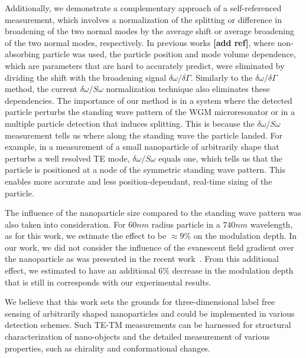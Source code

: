 \documentclass[journal=jacsat,manuscript=article]{achemso}
\begin{document}
Additionally, we demonstrate a complementary approach of a self-referenced measurement, which involves a normalization of the splitting or difference in broadening of the two normal modes by the average shift or average broadening of the two normal modes, respectively. In previous works \textbf{[add ref]}, where non-absorbing particle was used, the particle position and mode volume dependence, which are parameters that are hard to accurately predict, were eliminated by dividing the shift with the broadening signal $\delta \omega / \delta \Gamma$. Similarly to the $\delta \omega / \delta \Gamma$ method, the current $\delta \omega / \textit{S} \omega$ normalization technique also eliminates these dependencies. The importance of our method is in a system where the detected particle perturbs the standing wave pattern of the WGM microresonator or in a multiple particle detection that induces splitting. This is because the $\delta \omega / \textit{S} \omega$ measurement tells us where along the standing wave the particle landed. For example, in a measurement of a small nanoparticle of arbitrarily shape that perturbs a well resolved TE mode, $\delta \omega / \textit{S} \omega$ equals one, which tells us that the particle is positioned at a node of the symmetric standing wave pattern. This enables more accurate and less position-dependant, real-time sizing of the particle.

The influence of the nanoparticle size compared to the standing wave pattern was also taken into consideration. For $60nm$ radius particle in a $740 nm$ wavelength, as for this work, we estimate the effect to be $\approx 9\% $ on the modulation depth.
In our work, we did not consider the influence of the evanescent field gradient over the nanoparticle as was presented in the recent work~\cite{foreman2017Whispering}. From this additional effect, we estimated to have an additional $6 \% $ decrease in the modulation depth that is still in corresponds with our experimental results.

We believe that this work sets the grounds for three-dimensional label free sensing of arbitrarily shaped nanoparticles and could be implemented in various detection schemes. Such TE-TM measurements can be harnessed for structural characterization of nano-objects and the detailed measurement of various properties, such as chirality and conformational changes.

\begin{acknowledgement}



\end{acknowledgement}
\end{document}
